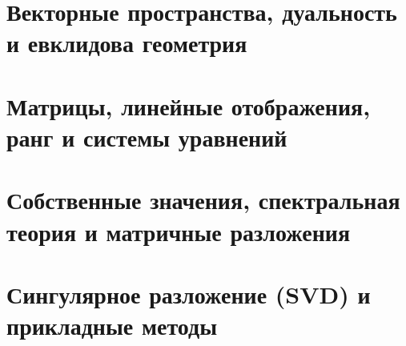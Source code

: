 \documentclass[12pt,a4paper]{report}
\theoremstyle{definition}
\theoremstyle{plain}
\theoremstyle{remark}
\begin{document}
    \newpage

    
    \chapter{Векторные пространства, дуальность и евклидова геометрия}
    

    \chapter{Матрицы, линейные отображения, ранг и системы уравнений}
    

    \chapter{Собственные значения, спектральная теория и матричные разложения}
    

    \chapter{Сингулярное разложение (SVD) и прикладные методы}
    
\end{document}
